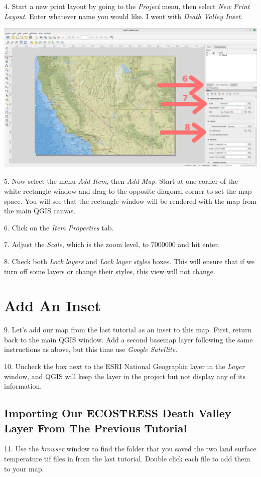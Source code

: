 \documentclass[oneside,a4paper,11pt,explicit]{book}
\begin{document}
4. Start a new print layout by going to the \textit{Project} menu, then select \textit{New Print Layout}. Enter whatever name you would like. I went with \textit{Death Valley Inset}.


\centerline{\includegraphics[width=\textwidth]{InsetItem.png}}

5. Now select the menu \textit{Add Item}, then \textit{Add Map}. Start at one corner of the white rectangle window and drag to the opposite diagonal corner to set the map space. You will see that the rectangle window will be rendered with the map from the main QGIS canvas.

6. Click on the \textit{Item Properties} tab.

7. Adjust the \textit{Scale}, which is the zoom level, to 7000000 and hit enter.

8. Check both \textit{Lock layers} and \textit{Lock layer styles} boxes. This will ensure that if we turn off some layers or change their styles, this view will not change.


\section{Add An Inset}

9. Let's add our map from the last tutorial as an inset to this map. First, return back to the main QGIS window. Add a second basemap layer following the same instructions as above, but this time use \textit{Google Satellite}.

10. Uncheck the box next to the ESRI National Geographic layer in the \emph{Layer} window, and QGIS will keep the layer in the project but not display any of its information.

\subsection{Importing Our ECOSTRESS Death Valley Layer From The Previous Tutorial}
11. Use the \textit{browser} window to find the folder that you saved the two land surface temperature tif files in from the last tutorial. Double click each file to add them to your map.
\end{document}

